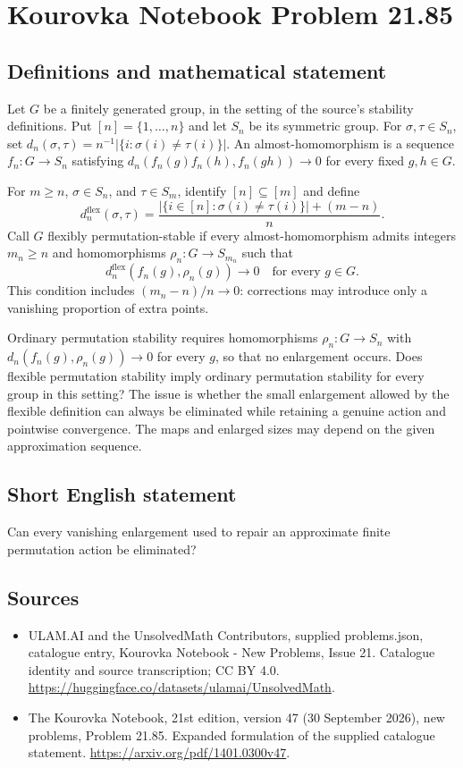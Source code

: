 \documentclass[11pt,a4paper]{article}
\begin{document}
\section*{Kourovka Notebook Problem 21.85}\label{statement}

\subsection{Definitions and mathematical statement}
Let $G$ be a finitely generated group, in the setting of the source's stability definitions. Put $[n]=\{1,\ldots,n\}$ and let $S_n$ be its symmetric group. For $\sigma,\tau\in S_n$, set $d_n(\sigma,\tau)=n^{-1}|\{i:\sigma(i)\ne\tau(i)\}|$. An almost-homomorphism is a sequence $f_n:G\to S_n$ satisfying $d_n(f_n(g)f_n(h),f_n(gh))\to0$ for every fixed $g,h\in G$.

For $m\ge n$, $\sigma\in S_n$, and $\tau\in S_m$, identify $[n]\subseteq[m]$ and define
\[
 d_n^{\mathrm{flex}}(\sigma,\tau)
 =\frac{|\{i\in[n]:\sigma(i)\ne\tau(i)\}|+(m-n)}{n}.
\]
Call $G$ flexibly permutation-stable if every almost-homomorphism admits integers $m_n\ge n$ and homomorphisms $\rho_n:G\to S_{m_n}$ such that
\[
 d_n^{\mathrm{flex}}(f_n(g),\rho_n(g))\longrightarrow0
 \quad\text{for every }g\in G.
\]
This condition includes $(m_n-n)/n\to0$: corrections may introduce only a vanishing proportion of extra points.

Ordinary permutation stability requires homomorphisms $\rho_n:G\to S_n$ with $d_n(f_n(g),\rho_n(g))\to0$ for every $g$, so that no enlargement occurs. Does flexible permutation stability imply ordinary permutation stability for every group in this setting? The issue is whether the small enlargement allowed by the flexible definition can always be eliminated while retaining a genuine action and pointwise convergence. The maps and enlarged sizes may depend on the given approximation sequence.
\subsection{Short English statement}
Can every vanishing enlargement used to repair an approximate finite permutation action be eliminated?
\subsection{Sources}
\begin{itemize}
\item[S1] ULAM.AI and the UnsolvedMath Contributors, supplied problems.json, catalogue entry, Kourovka Notebook - New Problems, Issue 21. Catalogue identity and source transcription; CC BY 4.0.
\url{https://huggingface.co/datasets/ulamai/UnsolvedMath}.
\item[S2] The Kourovka Notebook, 21st edition, version 47 (30 September 2026), new problems, Problem 21.85. Expanded formulation of the supplied catalogue statement.
\url{https://arxiv.org/pdf/1401.0300v47}.
\end{itemize}
\end{document}
